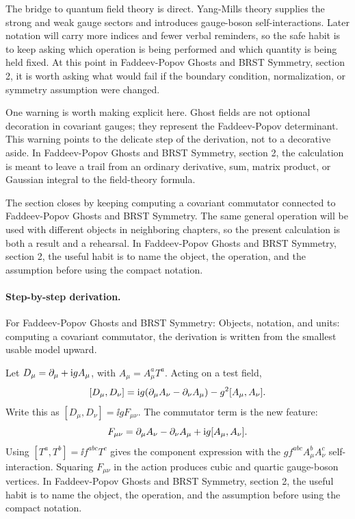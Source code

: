 The bridge to quantum field theory is direct.  Yang-Mills theory supplies the strong and weak gauge sectors and introduces gauge-boson self-interactions.  Later notation will carry more indices and fewer verbal reminders, so the safe habit is to keep asking which operation is being performed and which quantity is being held fixed.  At this point in Faddeev-Popov Ghosts and BRST Symmetry, section 2, it is worth asking what would fail if the boundary condition, normalization, or symmetry assumption were changed.

One warning is worth making explicit here.  Ghost fields are not optional decoration in covariant gauges; they represent the Faddeev-Popov determinant.  This warning points to the delicate step of the derivation, not to a decorative aside.  In Faddeev-Popov Ghosts and BRST Symmetry, section 2, the calculation is meant to leave a trail from an ordinary derivative, sum, matrix product, or Gaussian integral to the field-theory formula.

The section closes by keeping computing a covariant commutator connected to Faddeev-Popov Ghosts and BRST Symmetry.  The same general operation will be used with different objects in neighboring chapters, so the present calculation is both a result and a rehearsal.  In Faddeev-Popov Ghosts and BRST Symmetry, section 2, the useful habit is to name the object, the operation, and the assumption before using the compact notation.



\paragraph{Step-by-step derivation.}

For Faddeev-Popov Ghosts and BRST Symmetry: Objects, notation, and units: computing a covariant commutator, the derivation is written from the smallest usable model upward.

Let \(D_\mu=\partial_\mu+\mathrm i gA_\mu\), with \(A_\mu=A_\mu^aT^a\).  Acting on a test field,
\[
  [D_\mu,D_\nu]
  =
  \mathrm i g(\partial_\mu A_\nu-\partial_\nu A_\mu)-g^2[A_\mu,A_\nu].
\]
Write this as \([D_\mu,D_\nu]=\ii gF_{\mu\nu}\).  The commutator term is the new feature:
\[
  F_{\mu\nu}=\partial_\mu A_\nu-\partial_\nu A_\mu+\mathrm i g[A_\mu,A_\nu].
\]
Using \([T^a,T^b]=\ii f^{abc}T^c\) gives the component expression with the \(gf^{abc}A_\mu^bA_\nu^c\) self-interaction.  Squaring \(F_{\mu\nu}\) in the action produces cubic and quartic gauge-boson vertices.  In Faddeev-Popov Ghosts and BRST Symmetry, section 2, the useful habit is to name the object, the operation, and the assumption before using the compact notation.

